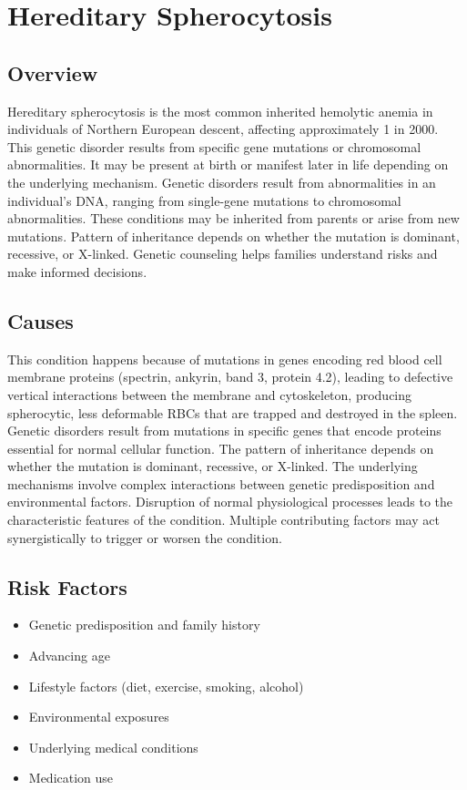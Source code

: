 \chapter{Hereditary Spherocytosis}
\label{sec:Hereditary Spherocytosis}

\section{Overview}
Hereditary spherocytosis is the most common inherited hemolytic anemia in individuals of Northern European descent, affecting approximately 1 in 2000. This genetic disorder results from specific gene mutations or chromosomal abnormalities. It may be present at birth or manifest later in life depending on the underlying mechanism. Genetic disorders result from abnormalities in an individual's DNA, ranging from single-gene mutations to chromosomal abnormalities. These conditions may be inherited from parents or arise from new mutations. Pattern of inheritance depends on whether the mutation is dominant, recessive, or X-linked. Genetic counseling helps families understand risks and make informed decisions.
\section{Causes}
This condition happens because of mutations in genes encoding red blood cell membrane proteins (spectrin, ankyrin, band 3, protein 4.2), leading to defective vertical interactions between the membrane and cytoskeleton, producing spherocytic, less deformable RBCs that are trapped and destroyed in the spleen. Genetic disorders result from mutations in specific genes that encode proteins essential for normal cellular function. The pattern of inheritance depends on whether the mutation is dominant, recessive, or X-linked. The underlying mechanisms involve complex interactions between genetic predisposition and environmental factors. Disruption of normal physiological processes leads to the characteristic features of the condition. Multiple contributing factors may act synergistically to trigger or worsen the condition.
\section{Risk Factors}


\begin{itemize}[noitemsep]
  \item Genetic predisposition and family history
  \item Advancing age
  \item Lifestyle factors (diet, exercise, smoking, alcohol)
  \item Environmental exposures
  \item Underlying medical conditions
  \item Medication use
\end{itemize}
